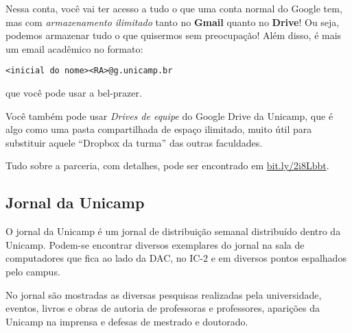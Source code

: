 Nessa conta, você vai ter acesso a tudo o que uma conta normal do Google tem,
mas com \emph{armazenamento ilimitado} tanto no \textbf{Gmail} quanto no
\textbf{Drive}! Ou seja, podemos armazenar tudo o que quisermos sem
preocupação! Além disso, é mais um email acadêmico no formato:
\begin{center}
\texttt{<inicial do nome><RA>@g.unicamp.br}
\end{center}
que você pode usar a bel-prazer.

Você também pode usar \emph{Drives de equipe} do Google Drive da Unicamp, que é
algo como uma pasta compartilhada de espaço ilimitado, muito útil para
substituir aquele ``Dropbox da turma'' das outras faculdades.

Tudo sobre a parceria, com detalhes, pode ser encontrado em
\url{bit.ly/2i8Lbbt}.

\subsection{Jornal da Unicamp}

O jornal da Unicamp é um jornal de distribuição semanal distribuído dentro da
Unicamp. Podem-se encontrar diversos exemplares do jornal na sala de
computadores que fica ao lado da DAC, no IC-2 e em diversos pontos espalhados
pelo campus.

No jornal são mostradas as diversas pesquisas realizadas pela universidade,
eventos, livros e obras de autoria de professoras e professores, aparições da
Unicamp na imprensa e defesas de mestrado e doutorado.
